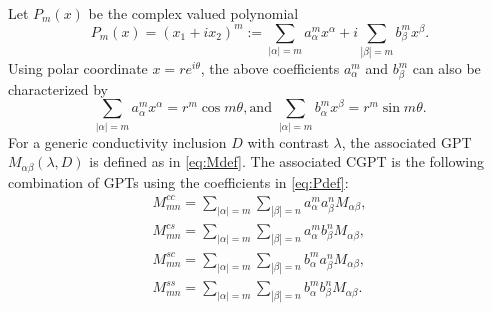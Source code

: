 Let $P_m(x)$ be the complex valued polynomial
\begin{equation}
P_m(x) = (x_1 + ix_2)^m := \sum_{|\alpha| = m} a^m_\alpha x^\alpha
+ i\sum_{|\beta| = m} b^m_\beta x^\beta. \label{eq:Pdef}
\end{equation}
Using polar coordinate $x = re^{i\theta}$, the above coefficients
$a^m_\alpha$ and $b^m_\beta$ can also be characterized by
\begin{equation}
\sum_{|\alpha| = m} a^m_\alpha x^\alpha = r^m \cos m\theta, \text{
and } \sum_{|\alpha| = m} b^m_\alpha x^\beta = r^m \sin m\theta.
\label{eq:abcomp}
\end{equation}
For a generic conductivity inclusion $D$ with contrast $\lambda$,
the associated GPT $M_{\alpha \beta}(\lambda, D)$ is defined as in
\eqref{eq:Mdef}. The associated CGPT is the following combination
of GPTs using the coefficients in \eqref{eq:Pdef}:
\begin{align}
M^{cc}_{mn} = \sum_{|\alpha| = m} \sum_{|\beta| = n} a^m_\alpha a^n_\beta M_{\alpha \beta}, \label{defc1}\\
M^{cs}_{mn} = \sum_{|\alpha| = m} \sum_{|\beta| = n} a^m_\alpha b^n_\beta M_{\alpha \beta},\\
M^{sc}_{mn} = \sum_{|\alpha| = m} \sum_{|\beta| = n} b^m_\alpha a^n_\beta M_{\alpha \beta},\\
M^{ss}_{mn} = \sum_{|\alpha| = m} \sum_{|\beta| = n} b^m_\alpha b^n_\beta M_{\alpha \beta}. \label{defc2}
\end{align}

